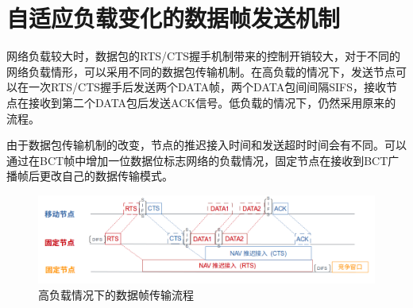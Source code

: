 \section {自适应负载变化的数据帧发送机制}
网络负载较大时，数据包的RTS/CTS握手机制带来的控制开销较大，对于不同的网络负载情形，可以采用不同的数据包传输机制。在高负载的情况下，发送节点可以在一次RTS/CTS握手后发送两个DATA帧，两个DATA包间间隔SIFS，接收节点在接收到第二个DATA包后发送ACK信号。低负载的情况下，仍然采用原来的流程。

由于数据包传输机制的改变，节点的推迟接入时间和发送超时时间会有不同。可以通过在BCT帧中增加一位数据位标志网络的负载情况，固定节点在接收到BCT广播帧后更改自己的数据传输模式。
\begin{figure}[!ht]
	\centering
	\includegraphics[scale=0.4]{figures/highload.png}
	\caption{
		高负载情况下的数据帧传输流程
	}
	\label{fig:example}
\end{figure}



\endinput